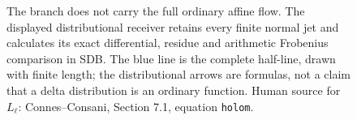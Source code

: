 \begin{figure}[ht]
\centering
{}
\caption{The branch does not carry the full ordinary affine flow.
The displayed distributional receiver retains every finite normal jet
and calculates its exact differential, residue and arithmetic
Frobenius comparison in SDB. The blue line is the complete half-line,
drawn with finite length; the distributional arrows are formulas,
not a claim that a delta distribution is an ordinary function.
Human source for $L_\ell$: Connes--Consani, Section 7.1,
equation \texttt{holom}.}
\end{figure}
